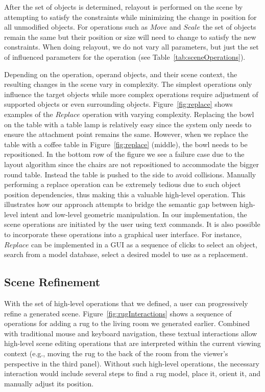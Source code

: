 \documentclass{sigchi}
\begin{document}
After the set of objects is determined, relayout is performed on the scene by attempting to satisfy the constraints while minimizing the change in position for all unmodified objects.  For operations such as $Move$ and $Scale$ the set of objects remain the same but their position or size will need to change to satisfy the new constraints.  When doing relayout, we do not vary all parameters, but just the set of influenced parameters for the operation (see  Table~\ref{tab:sceneOperations}).

Depending on the operation, operand objects, and their scene context, the resulting changes in the scene vary in complexity.  The simplest operations only influence the target objects while more complex operations require adjustment of supported objects or even surrounding objects.  Figure~\ref{fig:replace} shows examples of the $Replace$ operation with varying complexity.  Replacing the bowl on the table with a table lamp is relatively easy since the system only needs to ensure the attachment point remains the same.  However, when we replace the table with a coffee table in Figure~\ref{fig:replace} (middle), the bowl needs to be repositioned.  In the bottom row of the figure we see a failure case due to the layout algorithm since the chairs are not repositioned to accommodate the bigger round table. Instead the table is pushed to the side to avoid collisions.  Manually performing a replace operation can be extremely tedious due to such object position dependencies, thus making this a valuable high-level operation.  This illustrates how our approach attempts to bridge the semantic gap between high-level intent and low-level geometric manipulation.  In our implementation, the scene operations are initiated by the user using text commands.  It is also possible to incorporate these operations into a graphical user interface.  For instance, $Replace$ can be implemented in a GUI as a sequence of clicks to select an object, search from a model database, select a desired model to use as a replacement.

\subsection{Scene Refinement}

With the set of high-level operations that we defined, a user can progressively refine a generated scene.  Figure~\ref{fig:rugInteractions} shows a sequence of operations for adding a rug to the living room we generated earlier.  Combined with traditional mouse and keyboard navigation, these textual interactions allow high-level scene editing operations that are interpreted within the current viewing context (e.g., moving the rug to the back of the room from the viewer's perspective in the third panel).  Without such high-level operations, the necessary interaction would include several steps to find a rug model, place it, orient it, and manually adjust its position.
\end{document}
